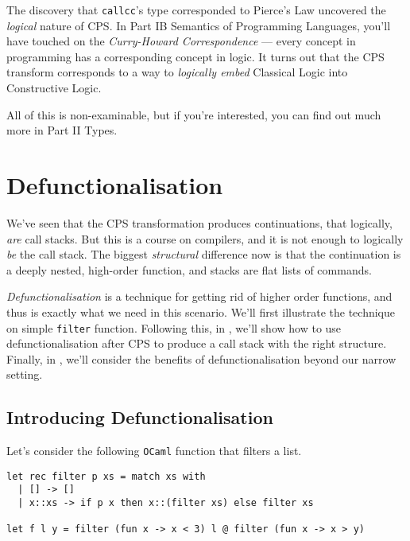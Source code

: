 The discovery that \texttt{callcc}'s type corresponded to Pierce's Law uncovered the \emph{logical} nature of CPS. In {\sffamily Part IB Semantics of Programming Languages}, you'll have touched on the \emph{Curry-Howard Correspondence} --- every concept in programming has a corresponding concept in logic. It turns out that the CPS transform corresponds to a way to \emph{logically embed} Classical Logic into Constructive Logic.

All of this is non-examinable, but if you're interested, you can find out much more in {\sffamily Part II Types}.

\section{Defunctionalisation}\label{section:defunctionalisation}
We've seen that the CPS transformation produces continuations, that logically, \emph{are} call stacks. But this is a course on compilers, and it is not enough to logically \emph{be} the call stack. The biggest \emph{structural} difference now is that the continuation is a deeply nested, high-order function, and stacks are flat lists of commands. 

\emph{Defunctionalisation} is a technique for getting rid of higher order functions, and thus is exactly what we need in this scenario. We'll first illustrate the technique on simple \texttt{filter} function. Following this, in , we'll show how to use defunctionalisation after CPS to produce a call stack with the right structure. Finally, in , we'll consider the benefits of defunctionalisation beyond our narrow setting.

\subsection{Introducing Defunctionalisation}
Let's consider the following \texttt{OCaml} function that filters a list.

\begin{code}
\label{code:defun-0}
\begin{verbatim}
let rec filter p xs = match xs with
  | [] -> []
  | x::xs -> if p x then x::(filter xs) else filter xs

let f l y = filter (fun x -> x < 3) l @ filter (fun x -> x > y)
\end{verbatim}
\end{code}

